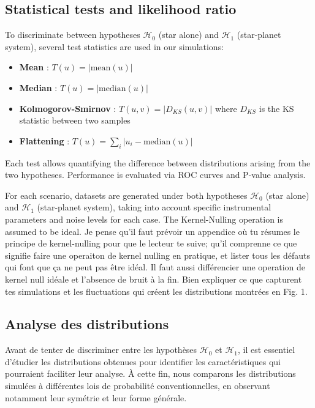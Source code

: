 \documentclass{article}
\newcommand{\dm}[1]{{\color{mulberry} #1}}
\begin{document}
\subsection{Statistical tests and likelihood ratio}

To discriminate between hypotheses $\mathcal{H}_0$ (star alone) and $\mathcal{H}_1$ (star-planet system), several test statistics are used in our simulations:

\begin{itemize}
    \item \textbf{Mean} : $T(u) = |\mathrm{mean}(u)|$
    \item \textbf{Median} : $T(u) = |\mathrm{median}(u)|$
    \item \textbf{Kolmogorov-Smirnov} : $T(u, v) = |D_{KS}(u, v)|$ where $D_{KS}$ is the KS statistic between two samples
    \item \textbf{Flattening} : $T(u) = \sum_i |u_i - \mathrm{median}(u)|$
\end{itemize}

Each test allows quantifying the difference between distributions arising from the two hypotheses. Performance is evaluated via ROC curves and P-value analysis.

For each scenario, datasets are generated under both hypotheses $\mathcal{H}_0$ (star alone) and $\mathcal{H}_1$ (star-planet system), taking into account specific instrumental parameters and noise levels for each case. The Kernel-Nulling operation is assumed to be ideal.\dm{Je pense qu'il faut prévoir un appendice où tu résumes le principe de kernel-nulling pour que le lecteur te suive; qu'il comprenne ce que signifie faire une operaiton de kernel nulling en pratique, et lister tous les défauts qui font que ça ne peut pas être idéal. Il faut aussi différencier une operation de kernel null idéale et l'absence de bruit à la fin. Bien expliquer ce que capturent tes simulations et les fluctuations qui créent les distributions montrées en Fig. 1.}



\subsection{Analyse des distributions}  \label{sec:distribution_analysis}

Avant de tenter de discriminer entre les hypothèses $\mathcal{H}_0$ et $\mathcal{H}_1$, il est essentiel d'étudier les distributions obtenues pour identifier les caractéristiques qui pourraient faciliter leur analyse. À cette fin, nous comparons les distributions simulées à différentes lois de probabilité conventionnelles, en observant notamment leur symétrie et leur forme générale.
\end{document}
